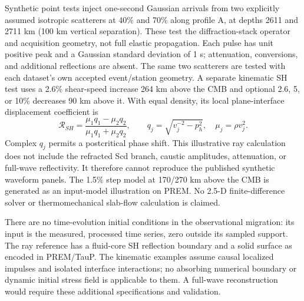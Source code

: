 Synthetic point tests inject one-second Gaussian arrivals from two explicitly
assumed isotropic scatterers at 40\% and 70\% along profile A, at depths
2611 and 2711 km (100 km vertical separation). These test the
diffraction-stack operator and acquisition geometry, not full elastic propagation.
Each pulse has unit positive peak and a Gaussian standard deviation of 1 s;
attenuation, conversions, and additional reflections are absent. The same two
scatterers are tested with each dataset's own accepted event/station geometry.
A separate kinematic SH test uses a 2.6\% shear-speed increase 264 km above the
CMB and optional 2.6, 5, or 10\% decreases 90 km above it. With equal density,
its local plane-interface displacement coefficient is
\begin{equation}
 \mathcal R_{SH}=\frac{\mu_1 q_1-\mu_2 q_2}{\mu_1 q_1+\mu_2 q_2},\qquad
 q_j=\sqrt{v_j^{-2}-p_h^2},\quad \mu_j=\rho v_j^2.
\end{equation}
Complex $q_j$ permits a postcritical phase shift. This illustrative ray calculation
does not include the refracted Scd branch, caustic amplitudes, attenuation, or
full-wave reflectivity. It therefore cannot reproduce the published synthetic
waveform panels. The 1.5\% step model at 170/270 km above the CMB is generated
as an input-model illustration on PREM. No 2.5-D finite-difference solver or
thermomechanical slab-flow calculation is claimed.

There are no time-evolution initial conditions in the observational migration:
its input is the measured, processed time series, zero outside its sampled
support. The ray reference has a fluid-core SH reflection boundary and a solid
surface as encoded in PREM/TauP. The kinematic examples assume causal localized
impulses and isolated interface interactions; no absorbing numerical boundary or
dynamic initial stress field is applicable to them. A full-wave reconstruction
would require these additional specifications and validation.
